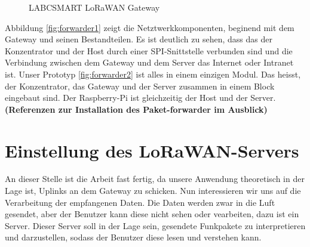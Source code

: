 \begin{figure}[h!]
	\centering
	\caption{LABCSMART LoRaWAN Gateway}
\end{figure}


Abbildung \ref{fig:forwarder1} zeigt die Netztwerkkomponenten, beginend mit dem Gateway und seinen Bestandteilen. Es ist deutlich zu sehen, dass das der Konzentrator und der Host durch einer SPI-Snittstelle verbunden sind und die Verbindung zwischen dem Gateway und dem Server das Internet oder Intranet ist. Unser Prototyp \ref{fig:forwarder2} ist alles in einem einzigen Modul. Das heisst, der Konzentrator, das Gateway und der Server zusammen in einem Block eingebaut sind. Der Raspberry-Pi ist gleichzeitig der Host und der Server. \textbf{(Referenzen zur Installation des Paket-forwarder im Ausblick)}

\vspace{8cm}
\section{Einstellung des LoRaWAN-Servers}\label{server}

An dieser Stelle ist die Arbeit fast fertig, da unsere Anwendung theoretisch in der Lage ist, Uplinks an dem Gateway zu schicken. Nun interessieren wir uns auf die Verarbeitung der empfangenen Daten. Die Daten werden zwar in die Luft gesendet, aber der Benutzer kann diese nicht sehen oder vearbeiten, dazu ist ein Server. Dieser Server soll in der Lage sein, gesendete Funkpakete zu interpretieren und darzustellen, sodass der Benutzer diese lesen und verstehen kann. 

